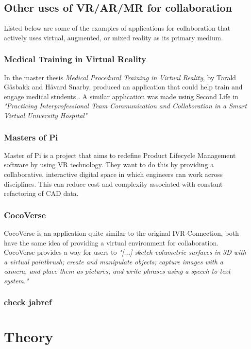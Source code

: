             
        \subsection{Other uses of VR/AR/MR for collaboration}
            Listed below are some of the examples of applications for collaboration that actively uses virtual, augmented, or mixed reality as its primary medium.
            
            \subsubsection{Medical Training in Virtual Reality}
                In the master thesis \emph{Medical Procedural Training in Virtual Reality}, by Tarald Gåsbakk and Håvard Snarby, produced an application that could help train and engage medical students \cite{gaasbakk2017}. A similar application was made using Second Life in \emph{"Practicing Interprofessional Team Communication and Collaboration in a Smart Virtual University Hospital"} \cite{Prasolova-Forland2018}

            \subsubsection{Masters of Pi}
                Master of Pi is a project that aims to redefine Product Lifecycle Management software by using VR technology. They want to do this by providing a collaborative, interactive digital space in which engineers can work across disciplines. This can reduce cost and complexity associated with constant refactoring of CAD data. \cite{mastersofpi}
            
            \subsubsection{CocoVerse}    
                CocoVerse\cite{Greenwald2017} is an application quite similar to the original IVR-Connection, both have the same idea of providing a virtual environment for collaboration. CocoVerse provides a way for users to \emph{"[...] sketch volumetric surfaces in 3D with a
                virtual paintbrush; create and manipulate objects; capture images with a camera, and place them as pictures; and
                write phrases using a speech-to-text system."}
            
            \subsubsection{check jabref}
    \section{Theory}
        